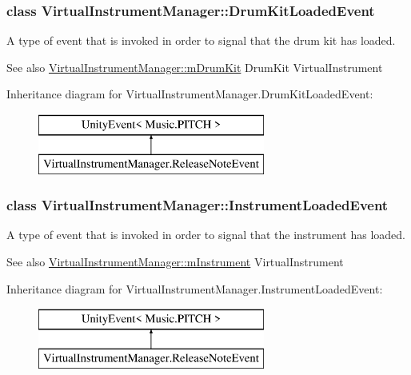 \subsubsection{class Virtual\+Instrument\+Manager\+:\+:Drum\+Kit\+Loaded\+Event}
A type of event that is invoked in order to signal that the drum kit has loaded. 

\begin{DoxySeeAlso}{See also}
\hyperlink{group___audio_management_a0bc7c9f776b0d2dae0ccb1f1ee5f2143}{Virtual\+Instrument\+Manager\+::m\+Drum\+Kit} Drum\+Kit Virtual\+Instrument 
\end{DoxySeeAlso}
Inheritance diagram for Virtual\+Instrument\+Manager.\+Drum\+Kit\+Loaded\+Event\+:\begin{figure}[H]
\begin{center}
\leavevmode
\includegraphics[height=2.000000cm]{group___event_types}
\end{center}
\end{figure}
\label{class_virtual_instrument_manager_1_1_instrument_loaded_event}
\subsubsection{class Virtual\+Instrument\+Manager\+:\+:Instrument\+Loaded\+Event}
A type of event that is invoked in order to signal that the instrument has loaded. 

\begin{DoxySeeAlso}{See also}
\hyperlink{group___audio_management_aed435d1f9be09864846db4322dc21fd1}{Virtual\+Instrument\+Manager\+::m\+Instrument} Virtual\+Instrument 
\end{DoxySeeAlso}
Inheritance diagram for Virtual\+Instrument\+Manager.\+Instrument\+Loaded\+Event\+:\begin{figure}[H]
\begin{center}
\leavevmode
\includegraphics[height=2.000000cm]{group___event_types}
\end{center}
\end{figure}
\label{class_virtual_instrument_manager_1_1_modify_echo_filter_event}
